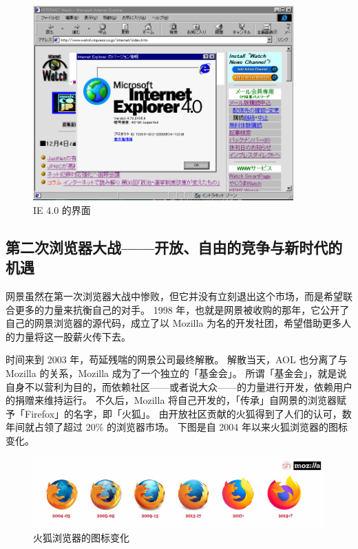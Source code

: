 \begin{figure}[htb!]
  \centering
  \includegraphics[width=10cm]{assets/IE_4.png}
  \caption{IE 4.0 的界面}
  \label{IE_4}
\end{figure}

\subsection[第二次浏览器大战——开放、自由的竞争与新时代的机遇]{第二次浏览器大战{\normalsize ——开放、自由的竞争与新时代的机遇}}

网景虽然在第一次浏览器大战中惨败，但它并没有立刻退出这个市场，而是希望联合更多的力量来抗衡自己的对手。
1998 年，也就是网景被收购的那年，它公开了自己的网景浏览器的源代码，成立了以 Mozilla 为名的开发社团，希望借助更多人的力量将这一股薪火传下去。

时间来到 2003 年，苟延残喘的网景公司最终解散。
解散当天，AOL 也分离了与 Mozilla 的关系，Mozilla 成为了一个独立的「基金会」。
所谓「基金会」，就是说自身不以营利为目的，而依赖社区——或者说大众——的力量进行开发，依赖用户的捐赠来维持运行。
不久后，Mozilla 将自己开发的，「传承」自网景的浏览器赋予「Firefox」的名字，即「火狐」。
由开放社区贡献的火狐得到了人们的认可，数年间就占领了超过 20\% 的浏览器市场。
下图是自 2004 年以来火狐浏览器的图标变化。

\begin{figure}[htb!]
  \centering
  \includegraphics[width=12cm]{assets/Firefox_Logo_History.jpg}
  \caption{火狐浏览器的图标变化}
  \label{Firefox_Logo_History}
\end{figure}

